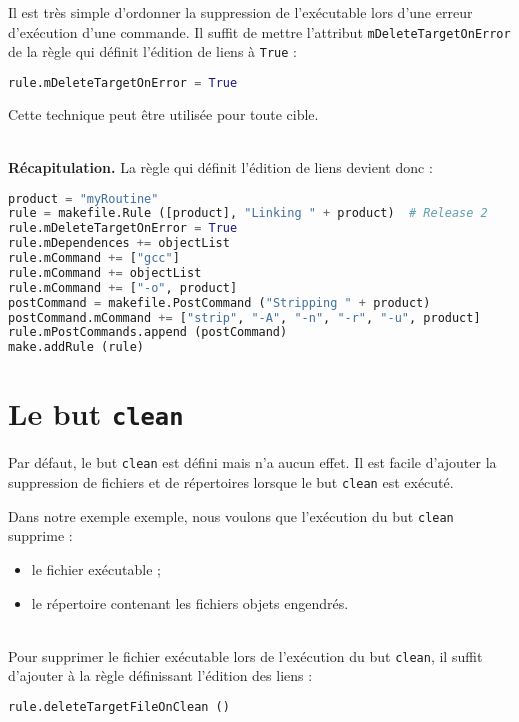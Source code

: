 \documentclass[a4paper,11pt]{extarticle}
\begin{document}
Il est très simple d'ordonner la suppression de l'exécutable lors d'une erreur d'exécution d'une commande. Il suffit de mettre l'attribut \texttt{mDeleteTargetOnError} de la règle qui définit l'édition de liens à \texttt{True} :
\begin{lstlisting}[language=py]
rule.mDeleteTargetOnError = True
\end{lstlisting}
Cette technique peut être utilisée pour toute cible.

~\\{\bf Récapitulation.} La règle qui définit l'édition de liens devient donc :
\begin{lstlisting}[language=py]
product = "myRoutine"
rule = makefile.Rule ([product], "Linking " + product)  # Release 2
rule.mDeleteTargetOnError = True
rule.mDependences += objectList
rule.mCommand += ["gcc"]
rule.mCommand += objectList
rule.mCommand += ["-o", product]
postCommand = makefile.PostCommand ("Stripping " + product)
postCommand.mCommand += ["strip", "-A", "-n", "-r", "-u", product]
rule.mPostCommands.append (postCommand)
make.addRule (rule)
\end{lstlisting}







\section{Le but \texttt{clean}}

Par défaut, le but \texttt{clean} est défini mais n'a aucun effet. Il est facile d'ajouter la suppression de fichiers et de répertoires lorsque le but \texttt{clean} est exécuté.

Dans notre exemple exemple, nous voulons que l'exécution du but \texttt{clean} supprime :
\begin{itemize}
  \item le fichier exécutable ;
  \item le répertoire contenant les fichiers objets engendrés.
\end{itemize}

~\\Pour supprimer le fichier exécutable lors de l'exécution du but \texttt{clean}, il suffit d'ajouter à la règle définissant l'édition des liens :

\begin{lstlisting}[language=py]
rule.deleteTargetFileOnClean ()
\end{lstlisting}
\end{document}
